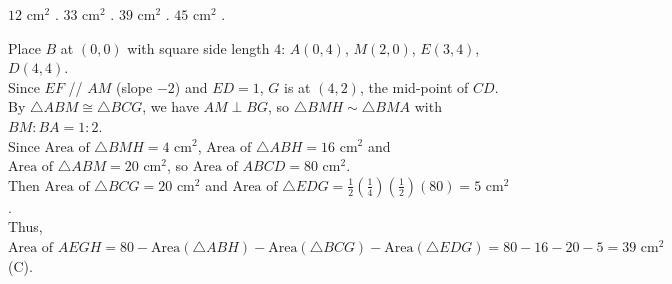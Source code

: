 \begin{minipage}{0.45\textwidth}
\begin{choices}
    \choice $12\text{ cm}^2$ .
    \choice $33\text{ cm}^2$ .
    \correctchoice $39\text{ cm}^2$ .
    \choice $45\text{ cm}^2$ .
\end{choices}
\end{minipage}
\begin{minipage}{0.52\textwidth}
\centering
{}
\end{minipage}
\begin{solution}
Place $B$ at $(0,0)$ with square side length $4$: $A(0,4)$, $M(2,0)$, $E(3,4)$, $D(4,4)$. \\
Since $EF$ // $AM$ (slope $-2$) and $ED = 1$, $G$ is at $(4,2)$, the mid-point of $CD$. \\
By $\triangle ABM \cong \triangle BCG$, we have $AM \perp BG$, so $\triangle BMH \sim \triangle BMA$ with $BM : BA = 1 : 2$. \\
Since $\text{Area of } \triangle BMH = 4\text{ cm}^2$, $\text{Area of } \triangle ABH = 16\text{ cm}^2$ and $\text{Area of } \triangle ABM = 20\text{ cm}^2$, so $\text{Area of } ABCD = 80\text{ cm}^2$. \\
Then $\text{Area of } \triangle BCG = 20\text{ cm}^2$ and $\text{Area of } \triangle EDG = \frac{1}{2}\left(\frac{1}{4}\right)\left(\frac{1}{2}\right)(80) = 5\text{ cm}^2$. \\
Thus, $\text{Area of } AEGH = 80 - \text{Area}(\triangle ABH) - \text{Area}(\triangle BCG) - \text{Area}(\triangle EDG) = 80 - 16 - 20 - 5 = 39\text{ cm}^2$ (C).
\end{solution}
